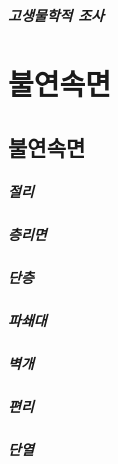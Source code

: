 \documentclass[12pt, a4paper, oneside]{book}
\begin{document}
		\paragraph{고생물학적 조사}
		
		
	
	
	
	




	
	
	
	\clearpage
	\chapter{불연속면}
	
	
	\clearpage
	\section{불연속면}
	
	
	
		\paragraph{절리}
		
		\paragraph{층리면}
		
		\paragraph{단층}
	

		\paragraph{파쇄대}
		
		\paragraph{벽개}
		
		\paragraph{편리}
		
		\paragraph{단열}
		
\end{document}
